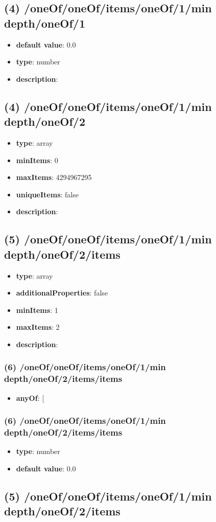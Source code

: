 \subsection{(4) /oneOf/oneOf/items/oneOf/1/min depth/oneOf/1}
\begin{itemize}[leftmargin=4em]\item {\bf default value}: 0.0
\item {\bf type}: number
\item {\bf description}: 
\end{itemize}\subsection{(4) /oneOf/oneOf/items/oneOf/1/min depth/oneOf/2}
\begin{itemize}[leftmargin=4em]\item {\bf type}: array
\item {\bf minItems}: 0
\item {\bf maxItems}: 4294967295
\item {\bf uniqueItems}: false
\item {\bf description}: 
\end{itemize}\subsection{(5) /oneOf/oneOf/items/oneOf/1/min depth/oneOf/2/items}
\begin{itemize}[leftmargin=5em]\item {\bf type}: array
\item {\bf additionalProperties}: false
\item {\bf minItems}: 1
\item {\bf maxItems}: 2
\item {\bf description}: 
\end{itemize}\subsubsection{(6) /oneOf/oneOf/items/oneOf/1/min depth/oneOf/2/items/items}
\begin{itemize}[leftmargin=6em]\item {\bf anyOf}: [\end{itemize}\subsubsection{(6) /oneOf/oneOf/items/oneOf/1/min depth/oneOf/2/items/items}
\begin{itemize}[leftmargin=6em]\item {\bf type}: number\item {\bf default value}: 0.0
\end{itemize}\subsection{(5) /oneOf/oneOf/items/oneOf/1/min depth/oneOf/2/items}
